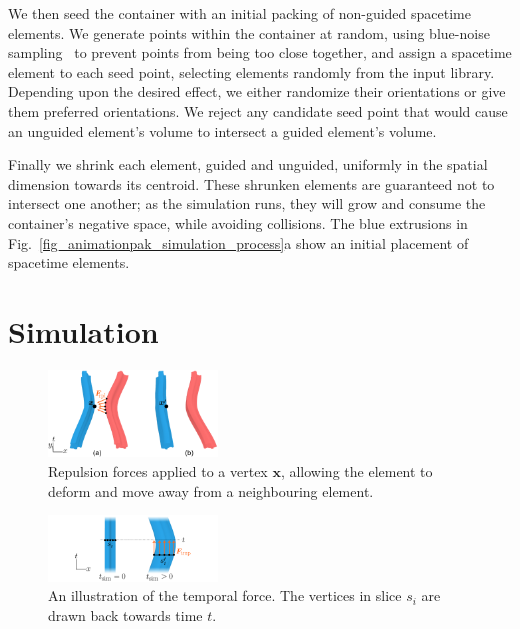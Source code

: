 We then seed the container with an initial packing of non-guided
spacetime elements.  We generate points within the container at random, 
using blue-noise sampling~\cite{Bridson2007}
to prevent points from being too close together,
and assign a spacetime element to
each seed point, selecting elements randomly from the input library.
Depending upon the desired effect, we either randomize their orientations
or give them preferred orientations.  We reject any candidate seed point
that would cause an unguided element's volume to intersect a guided element's
volume.

Finally we shrink each element, guided and unguided, uniformly in the spatial dimension
towards its centroid.  These shrunken elements are
guaranteed not to intersect one another; as the simulation runs, they
will grow and consume the container's negative space, while avoiding
collisions.
The blue extrusions in Fig.~\ref{fig_animationpak_simulation_process}a show an
initial placement of spacetime elements.


\section{Simulation}
\label{animationpak_simulation}

\begin{figure} [t]
\centering
\includegraphics[width=0.4\textwidth]{figures/animationpak/repulsion_force.pdf} 
\caption[Repulsion forces applied to a vertex $\bm{x}$]
{\label{fig_animationpak_repulsion_force} 
Repulsion forces applied to a vertex $\bm{x}$, 
allowing the element to deform and move away from a neighbouring element.}
\end{figure}

\begin{figure}[t]
\centering
\includegraphics[width=0.4\textwidth]{figures/animationpak/t_force.pdf} 
\caption[An illustration of the temporal force]
{\label{fig_animationpak_t_force} 
An illustration of the temporal force.  The vertices in slice
$s_i$ are drawn back towards time $t$.
}
\end{figure}


